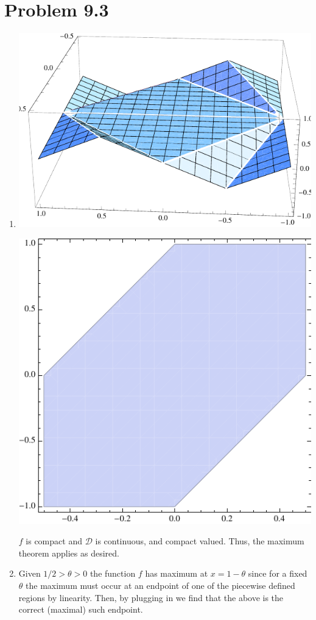 \documentclass[12pt]{article}
\begin{document}
\section{Problem 9.3}
\begin{enumerate}
\item \includegraphics{sketch1}

\includegraphics{sketch2}

$f$ is compact and $\mathcal{D}$ is continuous, and compact valued. Thus, the maximum theorem applies as desired.

\item Given $1/2>\theta>0$ the function $f$ has maximum at $x=1-\theta$ since for a fixed $\theta$ the maximum must occur at an endpoint of one of the piecewise defined regions by linearity. Then, by plugging in we find that the above is the correct (maximal) such endpoint.


\end{enumerate}
\end{document}
